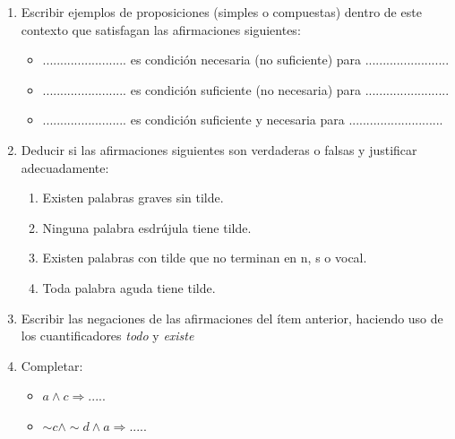\documentclass[12pt]{article}
\theoremstyle{definition}
\theoremstyle{remark}
\begin{document}
\begin{enumerate}
\begin{enumerate}
\item Escribir ejemplos de proposiciones (simples o compuestas) dentro de este contexto que satisfagan las afirmaciones siguientes: 
\begin{itemize}
\item ........................ es condición necesaria (no suficiente) para ........................
\item ........................ es condición suficiente (no necesaria) para ........................
\item ........................ es condición suficiente y necesaria para ...........................
\end{itemize}

\item Deducir si las afirmaciones siguientes son verdaderas o falsas y justificar adecuadamente:
\begin{enumerate}
\item Existen palabras graves sin tilde.
\item Ninguna palabra esdrújula tiene tilde.
\item Existen palabras con tilde que no terminan en n, s o vocal.
\item Toda palabra aguda tiene tilde.
\end{enumerate}

\item  Escribir las negaciones de las afirmaciones del ítem anterior, haciendo uso de los cuantificadores \textit{todo} y \textit{existe}

\item  Completar:
\begin{itemize}
\item $a \wedge c \Rightarrow  ..... $ 
\item $\sim c \wedge \sim d \wedge a \Rightarrow ..... $		 
\end{itemize}

\end{enumerate}


\end{enumerate}
\end{document}
